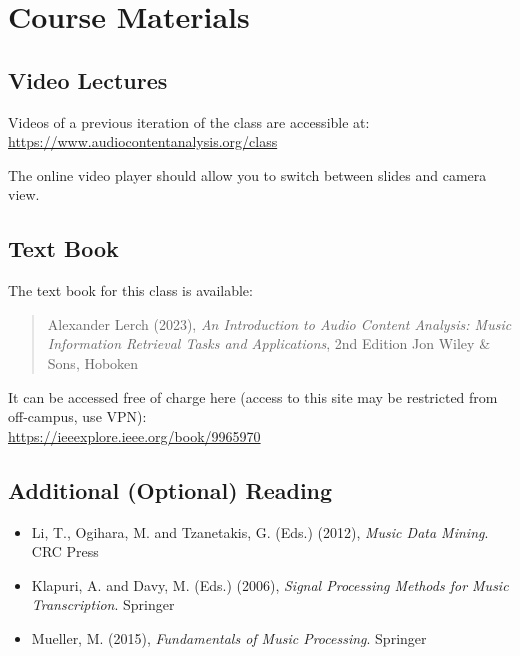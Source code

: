 \documentclass[letterpaper,oneside,10pt]{scrartcl}
\begin{document}
    \section{Course Materials}
        \subsection{Video Lectures}
            Videos of a previous iteration of the class are accessible at:\\            
            \url{https://www.audiocontentanalysis.org/class}
            
            The online video player should allow you to switch between slides and camera view.
            
        \subsection{Text Book}
            
           The text book for this class is available:
            \begin{quote}
            Alexander Lerch (2023), \textit{An Introduction to Audio Content Analysis: Music Information Retrieval Tasks and Applications}, 2nd Edition Jon Wiley \& Sons, Hoboken
            \end{quote}
            It can be accessed free of charge here (access to this site may be restricted from off-campus, use VPN):\\        
            \url{https://ieeexplore.ieee.org/book/9965970}
        
            
        \subsection{Additional (Optional) Reading}
            \begin{itemize}
                \item    Li, T., Ogihara, M. and Tzanetakis, G. (Eds.) (2012), \textit{Music Data Mining}. CRC Press 
                \item    Klapuri, A. and Davy, M. (Eds.) (2006), \textit{Signal Processing Methods for Music Transcription}. Springer 
                \item    Mueller, M. (2015), \textit{Fundamentals of Music Processing}. Springer
            \end{itemize}
        
\end{document}
